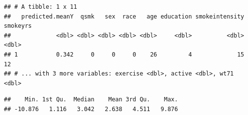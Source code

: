 \documentclass[
  10pt,
]{book}
\newenvironment{Shaded}{\begin{snugshade}}{\end{snugshade}}
\newcommand{\DecValTok}[1]{\textcolor[rgb]{0.00,0.00,0.81}{#1}}
\newcommand{\KeywordTok}[1]{\textcolor[rgb]{0.13,0.29,0.53}{\textbf{#1}}}
\newcommand{\NormalTok}[1]{#1}
\newcommand{\OperatorTok}[1]{\textcolor[rgb]{0.81,0.36,0.00}{\textbf{#1}}}
\newcommand{\StringTok}[1]{\textcolor[rgb]{0.31,0.60,0.02}{#1}}
\begin{document}
\begin{Shaded}
\end{Shaded}

\begin{verbatim}
## # A tibble: 1 x 11
##   predicted.meanY  qsmk   sex  race   age education smokeintensity smokeyrs
##             <dbl> <dbl> <dbl> <dbl> <dbl>     <dbl>          <dbl>    <dbl>
## 1           0.342     0     0     0    26         4             15       12
## # ... with 3 more variables: exercise <dbl>, active <dbl>, wt71 <dbl>
\end{verbatim}

\begin{Shaded}
\end{Shaded}

\begin{verbatim}
##    Min. 1st Qu.  Median    Mean 3rd Qu.    Max. 
## -10.876   1.116   3.042   2.638   4.511   9.876
\end{verbatim}

\begin{Shaded}
\end{Shaded}
\end{document}
